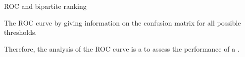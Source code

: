 \begin{frame}{ROC and bipartite ranking}


The ROC curve  by giving information on the confusion matrix for all possible thresholds.

\begin{figure}
    \centering
   
    
\end{figure}

Therefore, the analysis of the ROC curve is a  to assess the performance of a .


\end{frame}